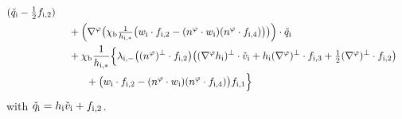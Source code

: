 \begin{lemma}
\begin{align*}
(\check{q}_\mathrm{i}-\tfrac12f_{{\rm i},2}) \\
&\quad\;
+ \Bigl(\nabla^\varphi\bigl(\chi_\mathrm{b}\tfrac{1}{h_{{\rm i},*}}
\bigl(w_\mathrm{i}\cdot f_{{\rm i},2}-(n^\varphi\cdot w_\mathrm{i})(n^\varphi\cdot f_{{\rm i},4}) \bigr) \bigr) \Bigr)\cdot\check{q}_\mathrm{i} \\
&\quad\;
+ \chi_\mathrm{b}\frac{1}{h_{{\rm i},*}}\Bigl\{
\lambda_{{\rm i},-}\bigl((n^\varphi)^\perp\cdot f_{{\rm i},2}\bigr)\bigl((\nabla^\varphi h_\mathrm{i})^\perp\cdot\check{v}_\mathrm{i}
+ h_\mathrm{i}(\nabla^\varphi)^\perp\cdot f_{{\rm i},3} + \tfrac12(\nabla^\varphi)^\perp\cdot f_{{\rm i},2} \bigr) \\
&\makebox[3em]{}
+ \bigl(w_\mathrm{i}\cdot f_{{\rm i},2}-(n^\varphi\cdot w_\mathrm{i})(n^\varphi\cdot f_{{\rm i},4}) \bigr)f_{{\rm i},1} \Bigr\}
\end{align*}
with $\check{q}_\mathrm{i}=h_\mathrm{i}\check{v}_\mathrm{i}+f_{{\rm i},2}$.
\end{lemma}

